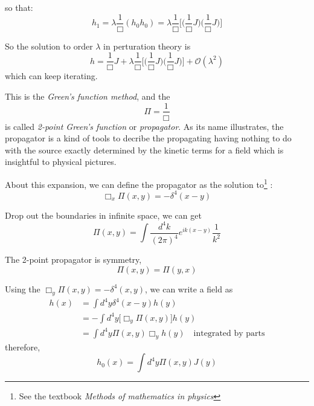 \documentclass[12pt,openany]{book}
\begin{document}
	so that:
	\begin{equation}
		h_1=\lambda\frac{1}{\Box}(h_0h_0)=\lambda\frac{1}{\Box}\big[\big(\frac{1}{\Box}J\big)\big(\frac{1}{\Box}J\big)\big]
	\end{equation}\par 
	So the solution to order $\lambda$ in perturation theory is 
	\begin{equation}
		h=\frac{1}{\Box}J+\lambda\frac{1}{\Box}\big[\big(\frac{1}{\Box}J\big)\big(\frac{1}{\Box}J\big)\big]+\mathcal{O}(\lambda^2)
	\end{equation}
	which can keep iterating.\par 
	This is the \textit{Green's function method}, and the 
	\begin{equation}
		\Pi=\frac{1}{\Box}
	\end{equation}
	is called \textit{2-point Green's function} or \textit{propagator}. As its name illustrates, the propagator is a kind of tools to decribe the 
	propagating having nothing to do with the source exactly determined by the kinetic terms for a field which is insightful to physical pictures.\par 
	About this expansion, we can define the propagator as the solution to\footnote{See the textbook \textit{Methods of mathematics in physics}} :
	\begin{equation}
		\Box_x\Pi(x,y)=-\delta^4(x-y)
	\end{equation}\par 
	Drop out the boundaries in infinite space, we can get
	\begin{equation}
		\Pi(x,y)=\int\frac{d^4k}{(2\pi)^4}e^{ik(x-y)}\frac{1}{k^2}
	\end{equation}\par 
	The 2-point propagator is symmetry,
	\begin{equation}
		\Pi(x,y)=\Pi(y,x)
	\end{equation}\par 
	Using the $\Box_y\Pi(x,y)=-\delta^4(x,y)$, we can write a field as
	\begin{equation}
		\begin{aligned}
			h(x)&=\int d^4y\delta^4(x-y)h(y)\\
			&=-\int d^4y\big[\Box_y\Pi(x,y)\big]h(y)\\
			&=\int d^4y\Pi(x,y)\Box_yh(y)\quad\text{integrated by parts}
		\end{aligned}
	\end{equation}
	therefore,
	\begin{equation}
		h_0(x)=\int d^4y \Pi(x,y)J(y)
	\end{equation}\par 
\end{document}
